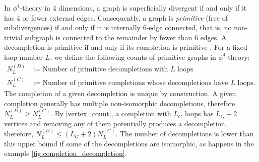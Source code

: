 \documentclass[11pt,a4paper]{article}
\renewcommand{\|}{\rule[-0.4ex]{0.2ex}{1.2em}}
\begin{document}
In $\phi^4$-theory in 4 dimensions, a graph is superficially divergent if and only if it has 4 or fewer external edges. Consequently, a graph is \emph{primitive} (free of subdivergences) if and only if it is internally 6-edge connected, that is, no non-trivial subgraph is connected to the remainder by fewer than 6 edges.
A decompletion is primitive if and only if its completion is primitive \cite{schnetz_quantum_2010}.
For a fixed loop number $L$, we define the following counts of primitive graphs in $\phi^4$-theory:
\begin{align}\label{def:NL}
	N^{(D)}_L &:= \text{Number of primitive decompletions with $L$ loops}\\
	N^{(C)}_L &:= \text{Number of primitive  completions whose decompletions have $L$ loops}.\nonumber
\end{align}
The completion of a given decompletion is unique by construction. A given completion generally has multiple non-isomorphic decompletions, therefore $N^{(D)}_L \geq N^{(C)}_L$. By \cref{vertex_count}, a completion with $L_G$ loops  has $L_G+2$ vertices and removing any of them potentially produces a decompletion, therefore, $N^{(D)}_L \leq (L_G+2)N^{(C)}_L$. The number of decompletions is lower than this upper bound  if some of the decompletions are isomorphic, as happens in the example \cref{fig:completion_decompletion}.
\end{document}
